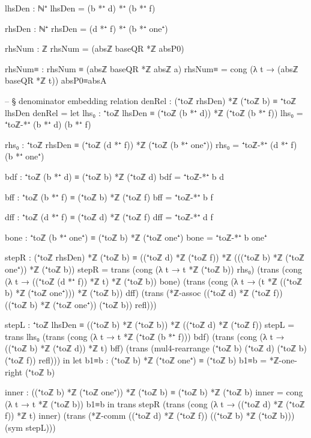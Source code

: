 \documentclass[11pt,a4paper]{book}
\begin{document}
\begin{code}
    lhsDen : ℕ⁺
    lhsDen = (b *⁺ d) *⁺ (b *⁺ f)

    rhsDen : ℕ⁺
    rhsDen = (d *⁺ f) *⁺ (b *⁺ one⁺)

    rhsNum : ℤ
    rhsNum = (absℤ baseQR *ℤ absP0)

    rhsNum≡ : rhsNum ≡ (absℤ baseQR *ℤ absℤ a)
    rhsNum≡ = cong (λ t → (absℤ baseQR *ℤ t)) absP0≡absA

    -- § denominator embedding relation
    denRel : (⁺toℤ rhsDen) *ℤ (⁺toℤ b) ≡ ⁺toℤ lhsDen
    denRel =
      let
        lhs₀ : ⁺toℤ lhsDen ≡ (⁺toℤ (b *⁺ d)) *ℤ (⁺toℤ (b *⁺ f))
        lhs₀ = ⁺toℤ-*⁺ (b *⁺ d) (b *⁺ f)

        rhs₀ : ⁺toℤ rhsDen ≡ (⁺toℤ (d *⁺ f)) *ℤ (⁺toℤ (b *⁺ one⁺))
        rhs₀ = ⁺toℤ-*⁺ (d *⁺ f) (b *⁺ one⁺)

        bdf : ⁺toℤ (b *⁺ d) ≡ (⁺toℤ b) *ℤ (⁺toℤ d)
        bdf = ⁺toℤ-*⁺ b d

        bff : ⁺toℤ (b *⁺ f) ≡ (⁺toℤ b) *ℤ (⁺toℤ f)
        bff = ⁺toℤ-*⁺ b f

        dff : ⁺toℤ (d *⁺ f) ≡ (⁺toℤ d) *ℤ (⁺toℤ f)
        dff = ⁺toℤ-*⁺ d f

        bone : ⁺toℤ (b *⁺ one⁺) ≡ (⁺toℤ b) *ℤ (⁺toℤ one⁺)
        bone = ⁺toℤ-*⁺ b one⁺

        stepR : (⁺toℤ rhsDen) *ℤ (⁺toℤ b) ≡ ((⁺toℤ d) *ℤ (⁺toℤ f)) *ℤ (((⁺toℤ b) *ℤ (⁺toℤ one⁺)) *ℤ (⁺toℤ b))
        stepR =
          trans
            (cong (λ t → t *ℤ (⁺toℤ b)) rhs₀)
            (trans
              (cong (λ t → ((⁺toℤ (d *⁺ f)) *ℤ t) *ℤ (⁺toℤ b)) bone)
              (trans
                (cong (λ t → (t *ℤ ((⁺toℤ b) *ℤ (⁺toℤ one⁺))) *ℤ (⁺toℤ b)) dff)
                (trans
                  (*ℤ-assoc ((⁺toℤ d) *ℤ (⁺toℤ f)) ((⁺toℤ b) *ℤ (⁺toℤ one⁺)) (⁺toℤ b))
                  refl)))

        stepL : ⁺toℤ lhsDen ≡ ((⁺toℤ b) *ℤ (⁺toℤ b)) *ℤ ((⁺toℤ d) *ℤ (⁺toℤ f))
        stepL =
          trans
            lhs₀
            (trans
              (cong (λ t → t *ℤ (⁺toℤ (b *⁺ f))) bdf)
              (trans
                (cong (λ t → ((⁺toℤ b) *ℤ (⁺toℤ d)) *ℤ t) bff)
                (trans
                  (mul4-rearrange (⁺toℤ b) (⁺toℤ d) (⁺toℤ b) (⁺toℤ f))
                  refl)))
      in
      let
        b1≡b : (⁺toℤ b) *ℤ (⁺toℤ one⁺) ≡ (⁺toℤ b)
        b1≡b = *ℤ-one-right (⁺toℤ b)

        inner : ((⁺toℤ b) *ℤ (⁺toℤ one⁺)) *ℤ (⁺toℤ b) ≡ (⁺toℤ b) *ℤ (⁺toℤ b)
        inner = cong (λ t → t *ℤ (⁺toℤ b)) b1≡b
      in
      trans
        stepR
        (trans
          (cong (λ t → ((⁺toℤ d) *ℤ (⁺toℤ f)) *ℤ t) inner)
          (trans
            (*ℤ-comm ((⁺toℤ d) *ℤ (⁺toℤ f)) ((⁺toℤ b) *ℤ (⁺toℤ b)))
            (sym stepL)))


\end{code}
\end{document}
